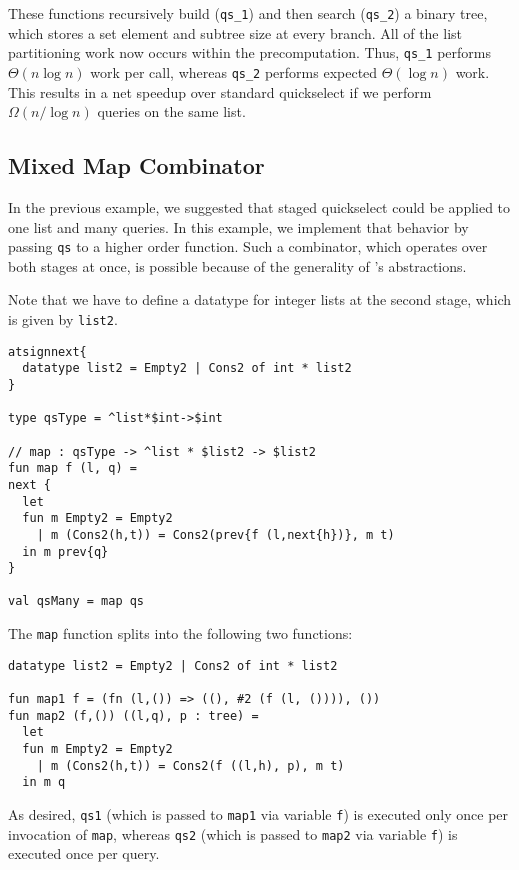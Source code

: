 These functions recursively build ({\tt qs\_1}) and then search ({\tt qs\_2}) a binary tree,
which stores a set element and subtree size at every branch.
All of the list partitioning work now occurs within the precomputation.
Thus, {\tt qs\_1} performs $\Theta(n \log n)$ work per call, whereas {\tt qs\_2} performs expected $\Theta(\log n)$ work.
This results in a net speedup over standard quickselect if we perform $\Omega(n / \log n)$ queries on the same list. 


\subsection {Mixed Map Combinator}

In the previous example, we suggested that staged quickselect could be applied to one list and many queries.
In this example, we implement that behavior by passing \texttt{qs} to a higher order function.
Such a combinator, which operates over both stages at once, is possible because of the generality of \lang's abstractions.

Note that we have to define a datatype for integer lists at the second stage, which is given by \texttt{list2}.
\begin{lstlisting} 
atsignnext{
  datatype list2 = Empty2 | Cons2 of int * list2
}

type qsType = ^list*$int->$int

// map : qsType -> ^list * $list2 -> $list2
fun map f (l, q) = 
next {
  let 
  fun m Empty2 = Empty2
    | m (Cons2(h,t)) = Cons2(prev{f (l,next{h})}, m t)
  in m prev{q}
}

val qsMany = map qs
\end{lstlisting}
The \texttt{map} function splits into the following two functions:
\begin{lstlisting} 
datatype list2 = Empty2 | Cons2 of int * list2

fun map1 f = (fn (l,()) => ((), #2 (f (l, ()))), ())
fun map2 (f,()) ((l,q), p : tree) =
  let 
  fun m Empty2 = Empty2
    | m (Cons2(h,t)) = Cons2(f ((l,h), p), m t) 
  in m q
\end{lstlisting}

As desired, \texttt{qs1} (which is passed to \texttt{map1} via variable \texttt{f}) is executed only once per invocation of \texttt{map},
whereas \texttt{qs2} (which is passed to \texttt{map2} via variable \texttt{f}) is executed once per query.
